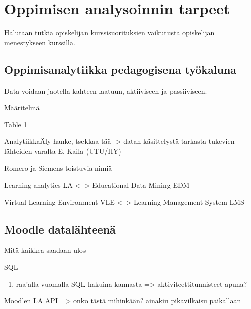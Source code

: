 \chapter{Oppimisen analysoinnin tarpeet\label{oppimisenanalysoinnintarpeet}}

Halutaan tutkia opiskelijan kurssisuorituksien vaikutusta opiskelijan menestykseen kurssilla.

\section{Oppimisanalytiikka pedagogisena työkaluna}

Data voidaan jaotella kahteen laatuun, aktiiviseen ja passiiviseen. \cite{maddenDigitalFootprints2007} \cite{mikkolaMitaOppimisanalytiikka2019}

Määritelmä \cite{siemensLearningAnalyticsEmergence2013}

Table 1 \cite{longPenetratingFogAnalytics}

AnalytiikkaÄly-hanke, tsekkaa tää -> datan käsittelystä tarkasta tukevien lähteiden varalta \cite{kokkonenEffectsDataCleaning}
E. Kaila (UTU/HY)

Romero ja Siemens toistuvia nimiä 

Learning analytics LA <--> Educational Data Mining EDM

Virtual Learning Environment VLE <--> Learning Management System LMS

\section{Moodle datalähteenä}

Mitä kaikkea saadaan ulos

SQL
\begin{enumerate}
    \item raa'alla vuomalla SQL hakuina kannasta => aktiviteettitunnisteet apuna?
\end{enumerate}


Moodlen LA API => onko tästä mihinkään? ainakin pikavilkaisu paikallaan

